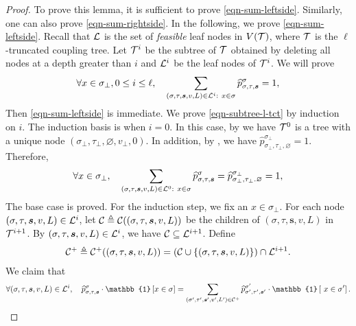 \documentclass[11pt]{article}
\newcommand{\id}[1]{\mathbb{1}\left[#1\right]}
\newcommand{\seqS}{\boldsymbol{s}}
\begin{document}
\begin{proof}
    To prove this lemma, it is sufficient to prove \eqref{eqn-sum-leftside}. Similarly, one can also prove \eqref{eqn-sum-rightside}.
    In the following, we prove \eqref{eqn-sum-leftside}.
    Recall that $\mathcal{L}$ is the set of \emph{feasible} leaf nodes in $V(\mathcal{T})$, where $\mathcal{T}$ is the $\ell$-truncated coupling tree. 
    Let $\mathcal{T}^{i}$ be the subtree of $\mathcal{T}$ obtained by deleting all nodes at a depth greater than $i$
    and $\mathcal{L}^{i}$ be the leaf nodes of $\mathcal{T}^{i}$.
    We will prove 
    \begin{align}\label{eqn-subtree-l-tct}
        \forall x\in \sigma_\bot,0\leq i\leq \ell, \quad \sum_{(\sigma,\tau, \seqS,v,L)\in \+L^i: \ x\in \sigma} \widehat{p}^{\sigma}_{\sigma,\tau,\seqS}=1,
    \end{align}
    Then \eqref{eqn-sum-leftside} is immediate.    
    We prove \eqref{eqn-subtree-l-tct} by induction on $i$.
    The induction basis is when $i = 0$.
    In this case, by  we have $\mathcal{T}^0$ is a tree with a unique node $(\sigma_\bot, \tau_\bot, \varnothing, v_\bot, 0)$.
    In addition, by , we have 
    $\widehat{p}^{\sigma_\bot}_{\sigma_\bot,\tau_\bot, \varnothing} = 1$.
    Therefore, 
     \begin{align*}
        \forall x\in \sigma_\bot, \quad \sum_{(\sigma,\tau, \seqS,v,L)\in \+L^0: \ x\in \sigma} \widehat{p}^{\sigma}_{\sigma,\tau,\seqS}=\widehat{p}^{\sigma_\bot}_{\sigma_\bot,\tau_\bot. \varnothing} = 1,
    \end{align*}
    The base case is proved. For the induction step, we fix an $x\in \sigma_\bot$.    
    For each node $(\sigma,\tau,\seqS,v,L)\in \+L^i$,
    let $\+C \triangleq \+C((\sigma,\tau,\seqS,v,L))$ be the children of $(\sigma,\tau,\seqS,v,L)$ in $\mathcal{T}^{i+1}$. 
    By $(\sigma,\tau,\seqS,v,L) \in \+L^{i}$, we have 
    $\mathcal{C}\subseteq \mathcal{L}^{i+1}$.
    Define 
    \begin{align}\label{def-cplus}
    \+C^{+} \triangleq \+C^{+}((\sigma,\tau,\seqS,v,L)) = \left(\+C\cup \{(\sigma,\tau,\seqS,v,L)\}\right)\cap \+L^{i+1}.
    \end{align}
    We claim that 
    \begin{align}\label{eq-extension-sum}
    \forall (\sigma,\tau,\seqS,v,L)\in \+L^i,\quad \widehat{p}^{\sigma}_{\sigma,\tau,\seqS}\cdot \id{x \in \sigma} = \sum_{(\sigma',\tau', \seqS',v',L')\in \+C^{+}} \widehat{p}^{\sigma'}_{\sigma',\tau',\seqS'}\cdot \id{\ x\in \sigma'}.
    \end{align}

\end{proof}
\end{document}
